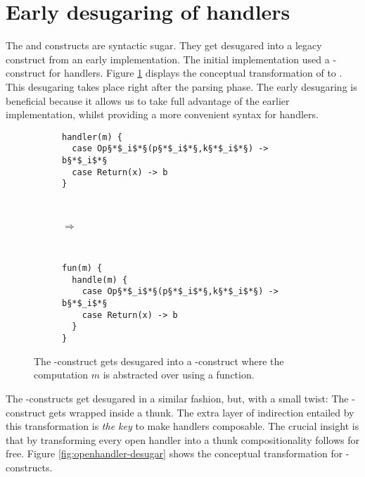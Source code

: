 
\section{Early desugaring of handlers}
The  and  constructs are syntactic sugar. They get desugared into a legacy construct from an early implementation. The initial implementation used a -construct for handlers. Figure \ref{fig:closedhandler-desugar} displays the conceptual transformation of  to . 
This desugaring takes place right after the parsing phase. The early desugaring is beneficial because it allows us to take full advantage of the earlier implementation, whilst providing a more convenient syntax for handlers.
\begin{figure}[h]
    \centering
    \begin{subfigure}[c]{0.45\textwidth}
        \centering
\begin{lstlisting}[style=links]
handler(m) {
  case Op§*$_i$*§(p§*$_i$*§,k§*$_i$*§) -> b§*$_i$*§
  case Return(x) -> b
}
\end{lstlisting}
    \end{subfigure}%
    ~ 
    \begin{subfigure}[c]{0.1\textwidth}
      $\Rightarrow$
    \end{subfigure}%
    ~
    \begin{subfigure}[c]{0.45\textwidth}
        \centering
\begin{lstlisting}[style=links]
fun(m) {
  handle(m) {
    case Op§*$_i$*§(p§*$_i$*§,k§*$_i$*§) -> b§*$_i$*§
    case Return(x) -> b
  }
}
\end{lstlisting}
    \end{subfigure}
\caption{The -construct gets desugared into a -construct where the computation $m$ is abstracted over using a function.}\label{fig:closedhandler-desugar}
\end{figure}

The -constructs get desugared in a similar fashion, but, with a small twist: The -construct gets wrapped inside a thunk. The extra layer of indirection entailed by this transformation is \emph{the key} to make handlers composable. The crucial insight is that by transforming every open handler into a thunk compositionality follows for free.
Figure \ref{fig:openhandler-desugar} shows the conceptual transformation for -constructs.

